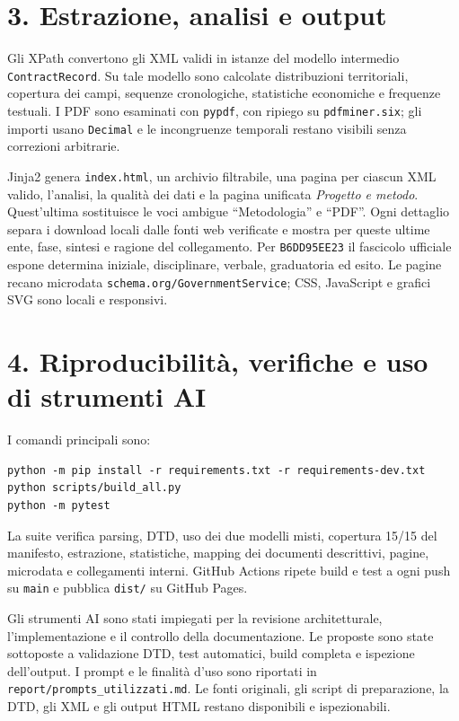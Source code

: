 \documentclass[10pt,a4paper]{article}
\newcommand{\code}[1]{\texttt{#1}}
\begin{document}
\section*{3. Estrazione, analisi e output}
Gli XPath convertono gli XML validi in istanze del modello intermedio \code{ContractRecord}. Su tale modello sono calcolate distribuzioni territoriali, copertura dei campi, sequenze cronologiche, statistiche economiche e frequenze testuali. I PDF sono esaminati con \code{pypdf}, con ripiego su \code{pdfminer.six}; gli importi usano \code{Decimal} e le incongruenze temporali restano visibili senza correzioni arbitrarie.

Jinja2 genera \code{index.html}, un archivio filtrabile, una pagina per ciascun XML valido, l'analisi, la qualità dei dati e la pagina unificata \emph{Progetto e metodo}. Quest'ultima sostituisce le voci ambigue “Metodologia” e “PDF”. Ogni dettaglio separa i download locali dalle fonti web verificate e mostra per queste ultime ente, fase, sintesi e ragione del collegamento. Per \code{B6DD95EE23} il fascicolo ufficiale espone determina iniziale, disciplinare, verbale, graduatoria ed esito. Le pagine recano microdata \code{schema.org/GovernmentService}; CSS, JavaScript e grafici SVG sono locali e responsivi.

\newpage
\section*{4. Riproducibilità, verifiche e uso di strumenti AI}
I comandi principali sono:
\begin{verbatim}
python -m pip install -r requirements.txt -r requirements-dev.txt
python scripts/build_all.py
python -m pytest
\end{verbatim}
La suite verifica parsing, DTD, uso dei due modelli misti, copertura 15/15 del manifesto, estrazione, statistiche, mapping dei documenti descrittivi, pagine, microdata e collegamenti interni. GitHub Actions ripete build e test a ogni push su \code{main} e pubblica \code{dist/} su GitHub Pages.

Gli strumenti AI sono stati impiegati per la revisione architetturale, l'implementazione e il controllo della documentazione. Le proposte sono state sottoposte a validazione DTD, test automatici, build completa e ispezione dell'output. I prompt e le finalità d'uso sono riportati in \code{report/prompts\_utilizzati.md}. Le fonti originali, gli script di preparazione, la DTD, gli XML e gli output HTML restano disponibili e ispezionabili.
\end{document}
